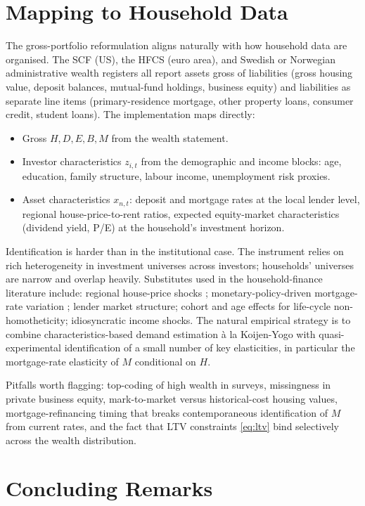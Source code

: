 \documentclass[11pt,a4paper]{article}
\begin{document}
\section{Mapping to Household Data}

The gross-portfolio reformulation aligns naturally with how household
data are organised. The SCF (US), the HFCS (euro area), and Swedish or
Norwegian administrative wealth registers all report assets gross of
liabilities (gross housing value, deposit balances, mutual-fund
holdings, business equity) and liabilities as separate line items
(primary-residence mortgage, other property loans, consumer credit,
student loans). The implementation maps directly:
\begin{itemize}
\item Gross $H,D,E,B,M$ from the wealth statement.
\item Investor characteristics $z_{i,t}$ from the demographic and
income blocks: age, education, family structure, labour income,
unemployment risk proxies.
\item Asset characteristics $x_{n,t}$: deposit and mortgage rates at
the local lender level, regional house-price-to-rent ratios, expected
equity-market characteristics (dividend yield, P/E) at the household's
investment horizon.
\end{itemize}
Identification is harder than in the institutional case. The
\citet{koijen2019demand} instrument relies on rich heterogeneity in
investment universes across investors; households' universes are
narrow and overlap heavily. Substitutes used in the household-finance
literature include: regional house-price shocks
\citep{kaplan2020housing}; monetary-policy-driven mortgage-rate
variation \citep{greenwald2018mortgage}; lender market structure;
cohort and age effects for life-cycle non-homotheticity; idiosyncratic
income shocks. The natural empirical strategy is to combine
characteristics-based demand estimation à la Koijen-Yogo with
quasi-experimental identification of a small number of key
elasticities, in particular the mortgage-rate elasticity of $M$
conditional on $H$.

Pitfalls worth flagging: top-coding of high wealth in surveys,
missingness in private business equity, mark-to-market versus
historical-cost housing values, mortgage-refinancing timing that
breaks contemporaneous identification of $M$ from current rates, and
the fact that LTV constraints \eqref{eq:ltv} bind selectively across
the wealth distribution.

\section{Concluding Remarks}
\end{document}
